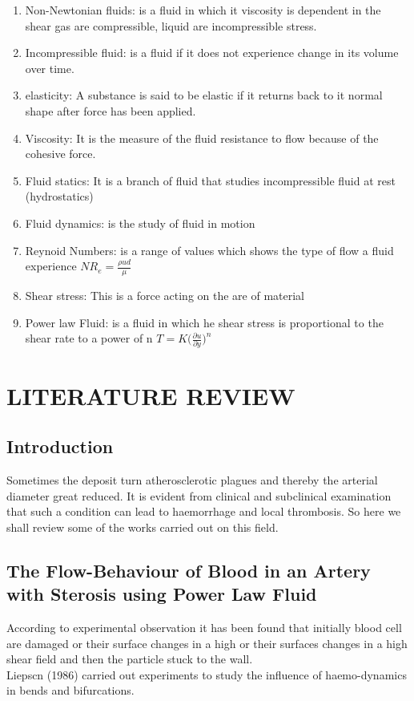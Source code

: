 \documentclass[12pt]{report}
\newcommand{\sps}{\\[0.2cm]}
\newcommand{\dsp}{\displaystyle}
\begin{document}
\begin{enumerate}
		\item Non-Newtonian fluids: is a fluid in which it viscosity is dependent in the shear gas are compressible, liquid are incompressible stress.
		
		\item Incompressible fluid: is a fluid if it does not experience change in its volume over time.
		
		\item elasticity: A substance is said to be elastic if it returns back to it normal shape after force has been applied.
		
		\item Viscosity: It is the measure of the fluid resistance to flow because of the cohesive force.
		
		\item Fluid statics: It is a branch of fluid that studies incompressible fluid at rest (hydrostatics)
		
		\item Fluid dynamics: is the study of fluid in motion
		
		\item Reynoid Numbers: is a range of values which shows the type of flow a fluid experience $\dsp NR_e = \frac{\rho ud}{\mu}$
		
		\item Shear stress: This is a force acting on the are of material
		
		\item Power law Fluid: is a fluid in which he shear stress is proportional to the shear rate to a power of n $\dsp T = K\Big(\frac{\partial u}{\partial y}\Big)^n$
	\end{enumerate}
	
	
	\chapter{LITERATURE REVIEW}
	\section{Introduction}
	Sometimes the deposit turn atherosclerotic plagues and thereby the arterial diameter great reduced. It is evident from clinical and subclinical examination that such a condition can lead to haemorrhage and local thrombosis. So here we shall review some of the works carried out on this field.
	
	\section{The Flow-Behaviour of Blood in an Artery with Sterosis using Power Law Fluid}
	According to experimental observation it has been found that initially blood cell are damaged or their surface changes in a high or their surfaces changes in a high shear field and then the particle stuck to the wall.\sps
	Liepscn (1986) carried out experiments to study the influence of haemo-dynamics in bends and bifurcations.\sps
	
\end{document}
